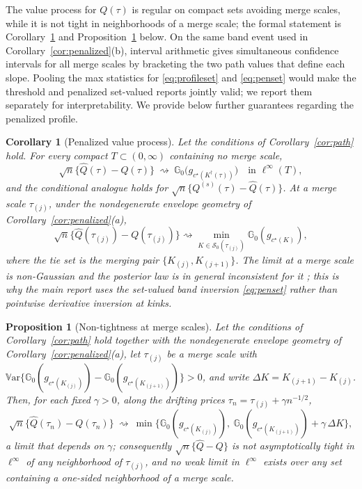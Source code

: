\documentclass[11pt]{article}
\newtheorem{proposition}{Proposition}
\newtheorem{corollary}{Corollary}
\newcommand{\G}{\mathbb G}
\newcommand{\Var}{\mathbb V\mathrm{ar}}
\newcommand{\dto}{\rightsquigarrow}
\newcommand{\calS}{\mathcal S}
\begin{document}
The value process for $Q(\tau)$ is regular on compact sets avoiding merge scales, while it is not tight in neighborhoods of a merge scale; the formal statement is Corollary~\ref{cor:penalizedvalue} and Proposition~\ref{prop:nontight} below.  On the same band event used in Corollary~\ref{cor:penalized}\textup{(b)}, interval arithmetic gives simultaneous confidence intervals for all merge scales by bracketing the two path values that define each slope.  Pooling the max statistics for \eqref{eq:profileset} and \eqref{eq:penset} would make the threshold and penalized set-valued reports jointly valid; we report them separately for interpretability. We provide below further guarantees regarding the penalized profile. 


\begin{corollary}[Penalized value process]\label{cor:penalizedvalue}
Let the conditions of Corollary~\ref{cor:path} hold.  For every compact $T\subset(0,\infty)$ containing no merge scale,
\begin{equation*}
\sqrt n\bigl\{\widehat Q(\tau)-Q(\tau)\bigr\}\ \dto\ \G_0\bigl(g_{c^\star(K^\dagger(\tau))}\bigr)
\quad\text{in }\ell^\infty(T),
\end{equation*}
and the conditional analogue holds for $\sqrt n\{Q^{(s)}(\tau)-\widehat Q(\tau)\}$.  At a merge scale $\tau_{(j)}$, under the nondegenerate envelope geometry of Corollary~\ref{cor:penalized}\textup{(a)},
\begin{equation*}
\sqrt n\{\widehat Q(\tau_{(j)})-Q(\tau_{(j)})\}\dto\min_{K\in\calS_0(\tau_{(j)})}\G_0(g_{c^\star(K)}),
\end{equation*}
where the tie set is the merging pair $\{K_{(j)},K_{(j+1)}\}$.  The limit at a merge scale is non-Gaussian and the posterior law is in general inconsistent for it \citep{fang2019}; this is why the main report uses the set-valued band inversion \eqref{eq:penset} rather than pointwise derivative inversion at kinks.
\end{corollary}

\begin{proposition}[Non-tightness at merge scales]\label{prop:nontight}
Let the conditions of Corollary~\ref{cor:path} hold together with the nondegenerate envelope geometry of Corollary~\ref{cor:penalized}\textup{(a)}, let $\tau_{(j)}$ be a merge scale with $\Var\{\G_0(g_{c^\star(K_{(j)})})-\G_0(g_{c^\star(K_{(j+1)})})\}>0$, and write $\Delta K=K_{(j+1)}-K_{(j)}$. Then, for each fixed $\gamma>0$, along the drifting prices $\tau_n=\tau_{(j)}+\gamma n^{-1/2}$,
\begin{equation*}
\sqrt n\bigl\{\widehat Q(\tau_n)-Q(\tau_n)\bigr\}\ \dto\ \min\bigl\{\G_0(g_{c^\star(K_{(j)})}),\ \G_0(g_{c^\star(K_{(j+1)})})+\gamma\,\Delta K\bigr\},
\end{equation*}
a limit that depends on $\gamma$; consequently $\sqrt n\{\widehat Q-Q\}$ is not asymptotically tight in $\ell^\infty$ of any neighborhood of $\tau_{(j)}$, and no weak limit in $\ell^\infty$ exists over any set containing a one-sided neighborhood of a merge scale.
\end{proposition}
\end{document}

